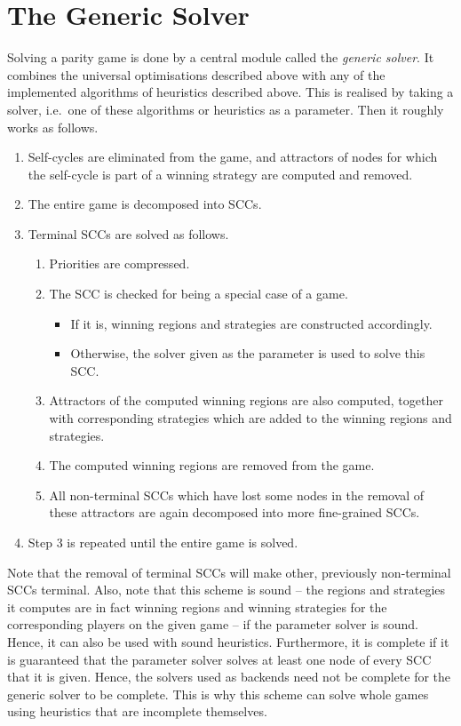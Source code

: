 \section{The Generic Solver}

Solving a parity game is done by a central module called the \emph{generic solver}.
It combines the universal optimisations described above with any of the implemented
algorithms of heuristics described above. This is realised by taking a solver, i.e.\
one of these algorithms or heuristics as a parameter. Then it roughly works as follows.
\begin{enumerate}
\item Self-cycles are eliminated from the game, and attractors of nodes for which the
      self-cycle is part of a winning strategy are computed and removed. 
\item The entire game is decomposed into SCCs.
\item Terminal SCCs are solved as follows.
      \begin{enumerate}
        \item Priorities are compressed.
        \item The SCC is checked for being a special case of a game.
              \begin{itemize}
                 \item If it is, winning regions and strategies are constructed accordingly.
                 \item Otherwise, the solver given as the parameter is used to solve this
                       SCC.
              \end{itemize}
        \item Attractors of the computed winning regions are also computed, together with 
              corresponding strategies which are added to the winning regions and strategies.
        \item The computed winning regions are removed from the game.
        \item All non-terminal SCCs which have lost some nodes in the removal of these
              attractors are again decomposed into more fine-grained SCCs.
      \end{enumerate}
\item Step 3 is repeated until the entire game is solved.
\end{enumerate}
Note that the removal of terminal SCCs will make other, previously non-terminal SCCs terminal.
Also, note that this scheme is sound -- the regions and strategies it computes are
in fact winning regions and winning strategies for the corresponding players on the given
game -- if the parameter solver is sound. Hence, it can also be used with sound heuristics.
Furthermore, it is complete if it is guaranteed that the parameter solver solves at least 
one node of every SCC that it is given. Hence, the solvers used as backends need not be 
complete for the generic solver to be complete. This is why this scheme can solve whole games
using heuristics that are incomplete themselves.

